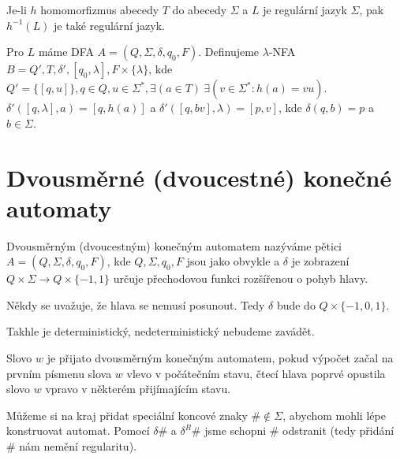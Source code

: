 \documentclass[12pt]{article}                   %
\begin{document}
    \begin{veta}
        Je-li $h$ homomorfizmus abecedy $T$ do abecedy $\Sigma$ a $L$ je regulární jazyk $\Sigma$, pak $h^{-1}(L)$ je také regulární jazyk.

        \begin{dukazin}
            Pro $L$ máme DFA $A = (Q, \Sigma, \delta, q_0, F)$. Definujeme $\lambda$-NFA $B = Q', T, \delta', [q_0, \lambda], F\times\{\lambda\}$, kde $Q' = \{[q, u]\}, q \in Q, u \in \Sigma^*, \exists (a \in T)\ \exists (v \in \Sigma^*: h(a) = vu)$. $\delta'([q, \lambda], a) = [q, h(a)]$ a $\delta'([q, bv], \lambda) = [p, v]$, kde $\delta(q, b) = p$ a $b \in \Sigma$.
        \end{dukazin}
    \end{veta}


\section{Dvousměrné (dvoucestné) konečné automaty}
    \begin{definice}
        Dvousměrným (dvoucestným) konečným automatem nazýváme pětici $A = (Q, \Sigma, \delta, q_0, F)$, kde $Q, \Sigma, q_0, F$ jsou jako obvykle a $\delta$ je zobrazení $Q \times \Sigma \rightarrow Q \times \{-1, 1\}$ určuje přechodovou funkci rozšířenou o pohyb hlavy.
    \end{definice}

    \begin{poznamka}
        Někdy se uvažuje, že hlava se nemusí posunout. Tedy $\delta$ bude do $Q \times \{-1, 0, 1\}$.

        Takhle je deterministický, nedeterministický nebudeme zavádět.
    \end{poznamka}

    \begin{definice}
        Slovo $w$ je přijato dvousměrným konečným automatem, pokud výpočet začal na prvním písmenu slova $w$ vlevo v počátečním stavu, čtecí hlava poprvé opustila slovo $w$ vpravo v některém přijímajícím stavu.
    \end{definice}

    \begin{poznamka}
        Můžeme si na kraj přidat speciální koncové znaky $\# \notin \Sigma$, abychom mohli lépe konstruovat automat. Pomocí $\delta\#$ a $\delta^R\#$ jsme schopni $\#$ odstranit (tedy přidání $\#$ nám nemění regularitu).
    \end{poznamka}
\end{document}
